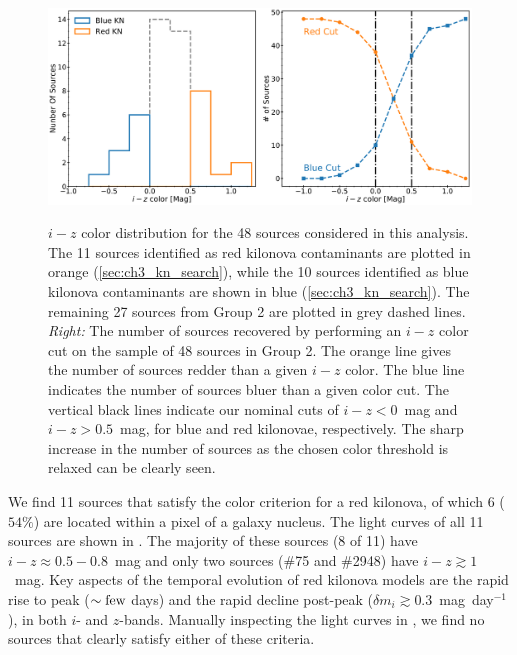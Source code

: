 \begin{figure}[!t]
\begin{center}
\hspace*{-0.1in}
\scalebox{1.}
{\includegraphics[width=\textwidth]{./figs/chapter3/f3.pdf}}
\caption{ $i-z$ color distribution for the 48 sources considered in this analysis. The 11 sources identified as red kilonova contaminants are plotted in orange (\cref{sec:ch3_kn_search}), while the 10 sources identified as blue kilonova contaminants are shown in blue (\cref{sec:ch3_kn_search}). The remaining 27 sources from Group 2 are plotted in grey dashed lines.
{\it Right:} The number of sources recovered by performing an $i-z$ color cut on the sample of 48 sources in Group 2. The orange line gives the number of sources redder than a given $i-z$ color. The blue line indicates the number of sources bluer than a given color cut. The vertical black lines indicate our nominal cuts of $i-z < 0$~mag and $i-z > 0.5$~mag, for blue and red kilonovae, respectively. The sharp increase in the number of sources as the chosen color threshold is relaxed can be clearly seen.}
\label{fig:ch3_color_dist_final}
\end{center}
\end{figure}

We find 11 sources that satisfy the color criterion for a red kilonova, of which 6 ($54\%$) are located within a pixel of a galaxy nucleus.  The light curves of all 11 sources are shown in . The majority of these sources (8 of 11) have $i-z \approx 0.5-0.8$~mag and only two sources (\#75 and \#2948) have $i-z \gtrsim 1$~mag. Key aspects of the temporal evolution of red kilonova models are the rapid rise to peak ($\sim \rm few$ days) and the rapid decline post-peak ($\delta m_i \gtrsim 0.3$~mag~day$^{-1}$), in both $i$- and $z$-bands. Manually inspecting the light curves in , we find no sources that clearly satisfy either of these criteria.


